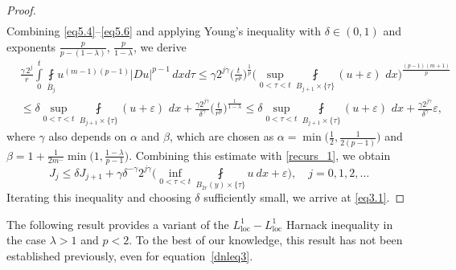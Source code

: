 \documentclass[a4paper,11pt,fullpage]{article}
\numberwithin{equation}{section}
\begin{document}
\begin{proof}
\begin{equation}
\begin{aligned}
\end{aligned}
\end{equation}
Combining \eqref{eq5.4}--\eqref{eq5.6} and applying Young's inequality with $\delta \in (0,1)$ and exponents  $\frac{p}{p-(1-\lambda)}$, $\frac{p}{1-\lambda}$, we derive 
\begin{align*}
&\frac{\gamma\,2^j}{r}\int\limits_0^{t}\fint\limits_{\bar B_{j}}u^{(m-1)(p-1)}|D u|^{p-1}\,dx d\tau
\leqslant \gamma 2^{j \gamma} \Big(\frac{t}{r^{p}}\Big)^{\frac{1}{p}}\Big(\sup\limits_{0<\tau<t}\fint\limits_{B_{j+1}\times\{\tau\}}(u+\varepsilon) \,\,dx\Big)^{\frac{(p-1)(m+1)}{p}}\\
&\leqslant
\delta \sup\limits_{0<\tau<t}\fint\limits_{B_{j+1}\times\{\tau\}}(u+\varepsilon)\,\, dx+\frac{\gamma 2^{j\gamma}}{\delta^{\gamma}}\Big(\frac{t}{r^{p}}\Big)^{\frac{1}{1-\lambda}}\leqslant \delta \sup\limits_{0<\tau<t}\fint\limits_{B_{j+1}\times\{\tau\}}(u+\varepsilon)\,\, dx+\frac{\gamma 2^{j\gamma}}{\delta^{\gamma} } \varepsilon,
\end{align*}
where $\gamma$ also depends on $\alpha$ and $\beta$, which are chosen as $\alpha=\min\Big(\frac{1}{2}, \frac{1}{2(p-1)}\Big)$ and $\beta=1+\frac{1}{2m^{-}} \min\big(1, \frac{1-\lambda}{p-1}\big)$.
Combining this estimate with \eqref{recurs_1}, we obtain
\begin{equation*}
J_{j} \leqslant \delta J_{j+1} + \gamma \delta^{-\gamma} 2^{j \gamma}\big(\inf\limits_{0< \tau <t} \fint\limits_{B_{2r}(y)\times\{\tau\}} u\ dx
+ \varepsilon\big), \quad j=0, 1, 2,\ldots
\end{equation*}
Iterating this inequality and choosing $\delta$ sufficiently small, we arrive at \eqref{eq3.1}.
\end{proof}


\noindent The following result provides a variant of the $L^{1}_{\mathrm{loc}}-L^{1}_{\mathrm{loc}}$ Harnack inequality in the case $\lambda>1$ and $p<2$. To the best of our knowledge, this result has not been established previously, even for equation~\eqref{dnleq3}.
\end{document}
